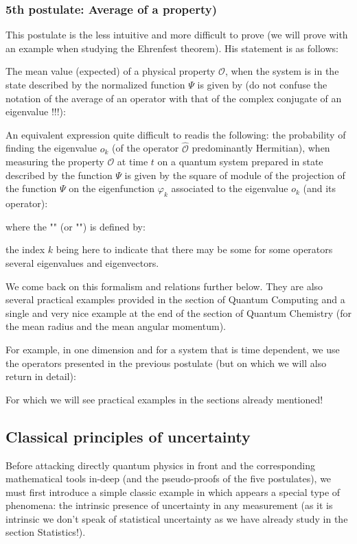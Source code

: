 	\subsubsection{5th postulate: Average of a property)}	
	This postulate is the less intuitive and more difficult to prove (we will prove with an example when studying the Ehrenfest theorem). His statement is as follows:

	The mean value (expected) of a physical property $\mathcal{O}$, when the system is in the state described by the normalized function $\Psi$ is given by (do not confuse the notation of the average of an operator with that of the complex conjugate of an eigenvalue !!!):
	
	An equivalent expression quite difficult to readis the following: the probability of finding the eigenvalue $o_k$ (of the operator $\hat{\mathcal{O}}$ predominantly Hermitian), when measuring the property $\mathcal{O}$ at time $t$ on a quantum system prepared in state described by the function $\Psi$ is given by the square of module of the projection of the function $\Psi$ on the eigenfunction $\varphi_k$ associated to the eigenvalue $o_k$ (and its operator):
	
	where the "" (or "") is defined by:
	
	the index $k$ being here to indicate that there may be some for some operators several eigenvalues and eigenvectors.
	\begin{tcolorbox}[title=Remark,colframe=black,arc=10pt]
	We come back on this formalism and relations further below. They are also several practical examples provided in the section of Quantum Computing and a single and very nice example at the end of the section of Quantum Chemistry (for the mean radius and the mean angular momentum).
	\end{tcolorbox}
	For example, in one dimension and for a system that is time dependent, we use the operators presented in the previous postulate (but on which we will also return in detail):
	
	For which we will see practical examples in the sections already mentioned!
	
	\pagebreak
	\subsection{Classical principles of uncertainty}
	Before attacking directly quantum physics in front and the corresponding mathematical tools in-deep (and the pseudo-proofs of the five postulates), we must first introduce a simple classic example in which appears a special type of phenomena: the intrinsic presence of uncertainty in any measurement (as it is intrinsic we don't speak of statistical uncertainty as we have already study in the section Statistics!).
	
